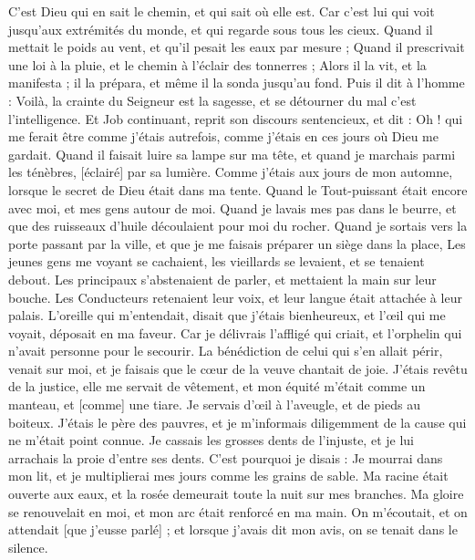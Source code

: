 \begin{multicols}{2}
C'est Dieu qui en sait le chemin, et qui sait où elle est.
Car c'est lui qui voit jusqu'aux extrémités du monde, et qui regarde sous tous les cieux.
Quand il mettait le poids au vent, et qu'il pesait les eaux par mesure ;
Quand il prescrivait une loi à la pluie, et le chemin à l'éclair des tonnerres ;
Alors il la vit, et la manifesta ; il la prépara, et même il la sonda jusqu'au fond.
Puis il dit à l'homme : Voilà, la crainte du Seigneur est la sagesse, et se détourner du mal c'est l'intelligence.
\VerseOne{}Et Job continuant, reprit son discours sentencieux, et dit :
Oh ! qui me ferait être comme j'étais autrefois, comme j'étais en ces jours où Dieu me gardait.
Quand il faisait luire sa lampe sur ma tête, et quand je marchais parmi les ténèbres, [éclairé] par sa lumière.
Comme j'étais aux jours de mon automne, lorsque le secret de Dieu était dans ma tente.
Quand le Tout-puissant était encore avec moi, et mes gens autour de moi.
Quand je lavais mes pas dans le beurre, et que des ruisseaux d'huile découlaient pour moi du rocher.
Quand je sortais vers la porte passant par la ville, et que je me faisais préparer un siège dans la place,
Les jeunes gens me voyant se cachaient, les vieillards se levaient, et se tenaient debout.
Les principaux s'abstenaient de parler, et mettaient la main sur leur bouche.
Les Conducteurs retenaient leur voix, et leur langue était attachée à leur palais.
L'oreille qui m'entendait, disait que j'étais bienheureux, et l'œil qui me voyait, déposait en ma faveur.
Car je délivrais l'affligé qui criait, et l'orphelin qui n'avait personne pour le secourir.
La bénédiction de celui qui s'en allait périr, venait sur moi, et je faisais que le cœur de la veuve chantait de joie.
J'étais revêtu de la justice, elle me servait de vêtement, et mon équité m'était comme un manteau, et [comme] une tiare.
Je servais d'œil à l'aveugle, et de pieds au boiteux.
J'étais le père des pauvres, et je m'informais diligemment de la cause qui ne m'était point connue.
Je cassais les grosses dents de l'injuste, et je lui arrachais la proie d'entre ses dents.
C'est pourquoi je disais : Je mourrai dans mon lit, et je multiplierai mes jours comme les grains de sable.
Ma racine était ouverte aux eaux, et la rosée demeurait toute la nuit sur mes branches.
Ma gloire se renouvelait en moi, et mon arc était renforcé en ma main.
On m'écoutait, et on attendait [que j'eusse parlé] ; et lorsque j'avais dit mon avis, on se tenait dans le silence.

\end{multicols}
